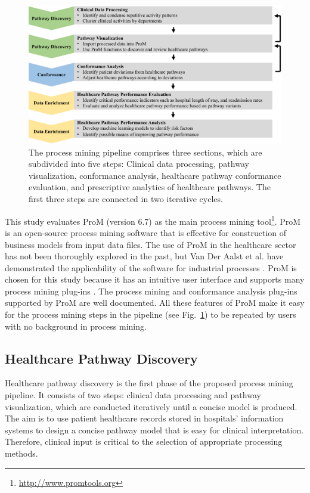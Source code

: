 \begin{figure}[t]
\centering
\includegraphics[width=\textwidth]{images/pipeline_diagram_journal.pdf}
\caption{The process mining pipeline comprises three sections, which
  are subdivided into five steps: Clinical data processing, pathway
  visualization, conformance analysis, healthcare pathway conformance
  evaluation, and prescriptive analytics of healthcare pathways. The
  first three steps are connected in two iterative cycles.}
\label{fig:pipeline}
\end{figure}

This study evaluates ProM (version 6.7) as the main process mining tool\footnote{\url{http://www.promtools.org}}. 
ProM is an open-source process mining software that is effective for construction of business models from input data files. The use of ProM in the healthcare sector has not been thoroughly explored in the past, but Van Der Aalst et al.  have demonstrated the applicability of the software for industrial processes \cite{VanDerAalst2007}. ProM is chosen for this study because it has an intuitive user interface and supports many process mining plug-ins \cite{VanDongen2005}. The process mining and conformance analysis plug-ins supported by ProM are well documented. All these features of ProM make it easy for the process mining steps in the pipeline (see Fig.~\ref{fig:pipeline}) to be repeated by users with no background in process mining.

\subsection{Healthcare Pathway Discovery}
Healthcare pathway discovery is the first phase of the proposed process mining pipeline. It consists of two steps: clinical data processing and pathway visualization, which are conducted iteratively until a concise model is produced.
The aim is to use patient healthcare records stored in hospitals’ information systems to design a concise pathway model that is easy for clinical interpretation. Therefore, clinical input is critical to the selection of appropriate processing methods. 

